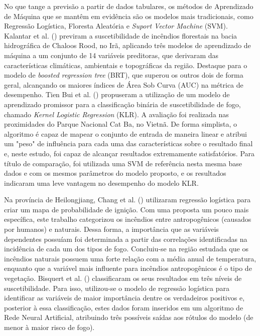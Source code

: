 \documentclass[tcc2]{uftex}
\begin{document}
No que tange a previsão a partir de dados tabulares, os métodos de Aprendizado de Máquina que se mantêm em evidência são os modelos mais tradicionais, como Regressão Logística, Floresta Aleatória e \textit{Suport Vector Machine} (SVM). Kalantar et al. (\citeyear{kalantar2020forest}) previram a suscetibilidade de incêndios florestais na bacia hidrográfica de Chaloos Rood, no Irã, aplicando três modelos de aprendizado de máquina a um conjunto de 14 variáveis preditoras, que derivaram das características climáticas, ambientais e topográficas da região. Destaque para o modelo de \textit{boosted regression tree} (BRT), que superou os outros dois de forma geral, alcançando os maiores índices de Área Sob Curva (AUC) na métrica de desempenho. Tien Bui et al. (\citeyear{tienbui2016tropical}) propuseram a utilização de um modelo de aprendizado promissor para a classificação binária de suscetibilidade de fogo, chamado \textit{Kernel Logistic Regression} (KLR). A avaliação foi realizada nas proximidades do Parque Nacional Cat Ba, no Vietnã. De forma simplista, o algoritmo é capaz de mapear o conjunto de entrada de maneira linear e atribui um "peso" de influência para cada uma das características sobre o resultado final e, neste estudo, foi capaz de alcançar resultados extremamente satisfatórios. Para título de comparação, foi utilizada uma SVM de referência nesta mesma base dados e com os mesmos parâmetros do modelo proposto, e os resultados indicaram uma leve vantagem no desempenho do modelo KLR.

Na província de Heilongjiang, Chang et al. (\citeyear{chang2013predicting}) utilizaram regressão logística para criar um mapa de probabilidade de ignição. Com uma proposta um pouco mais específica, este trabalho categorizou os incêndios entre antropogênicos (causados por humanos) e naturais. Dessa forma, a importância que as variáveis dependentes possuíam foi determinada a partir das correlações identificadas na incidência de cada um dos tipos de fogo. Concluiu-se na região estudada que os incêndios naturais possuem uma forte relação com a média anual de temperatura, enquanto que a variável mais influente para incêndios antropogênicos é o tipo de vegetação. Bisquert et al. (\citeyear{bisquert2012application}) classificaram os seus resultados em três níveis de suscetibilidade. Para isso, utilizou-se o modelo de regressão logística para identificar as variáveis de maior importância dentre os verdadeiros positivos e, posterior à essa classificação, estes dados foram inseridos em um algoritmo de Rede Neural Artificial, atribuindo três possíveis saídas aos rótulos do modelo (de menor à maior risco de fogo).
\end{document}
